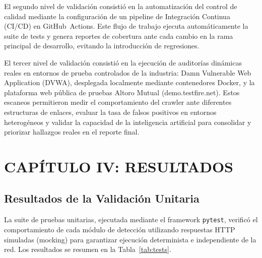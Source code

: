 \documentclass[12pt, a4paper]{article}
\begin{document}
El segundo nivel de validación consistió en la automatización del control de
calidad mediante la configuración de un pipeline de Integración Continua (CI/CD)
en GitHub~Actions. Este flujo de trabajo ejecuta automáticamente la suite de tests y
genera reportes de cobertura ante cada cambio en la rama principal de desarrollo,
evitando la introducción de regresiones.

El tercer nivel de validación consistió en la ejecución de auditorías dinámicas
reales en entornos de prueba controlados de la industria: Damn Vulnerable Web
Application (DVWA), desplegada localmente mediante contenedores Docker, y la
plataforma web pública de pruebas Altoro Mutual (demo.testfire.net). Estos escaneos
permitieron medir el comportamiento del crawler ante diferentes estructuras de
enlaces, evaluar la tasa de falsos positivos en entornos heterogéneos y validar la
capacidad de la inteligencia artificial para consolidar y priorizar hallazgos
reales en el reporte final.

\newpage
\section{CAPÍTULO IV: RESULTADOS}

\subsection{Resultados de la Validación Unitaria}

La suite de pruebas unitarias, ejecutada mediante el framework \texttt{pytest},
verificó el comportamiento de cada módulo de detección utilizando respuestas
HTTP simuladas (mocking) para garantizar ejecución determinista e independiente
de la red. Los resultados se resumen en la Tabla~\ref{tab:tests}.
\end{document}
